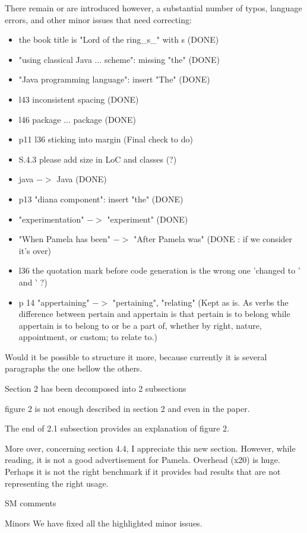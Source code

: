 \documentclass[10pt]{article}
\begin{document}
\begin{response}{There remain or are introduced however, a substantial number of typos, language errors, and other minor issues that need correcting:}
\begin{itemize}
\item the book title is "Lord of the ring\_s\_" with s (DONE)
\item "using classical Java ... scheme": missing "the" (DONE)
\item "Java programming language": insert "The" (DONE)
\item l43 inconsistent spacing (DONE)
\item l46 package ... package (DONE)
\item p11 l36 sticking into margin (Final check to do)
\item S.4.3 please add size in LoC and classes (?)
\item java $->$ Java (DONE)
\item p13 "diana component": insert "the" (DONE)
\item "experimentation" $->$ "experiment" (DONE)
\item "When Pamela has been" $->$ "After Pamela was" (DONE : if we consider it's over)
\item l36 the quotation mark before code generation is the wrong one 'changed to ' and ' ?)
\item p 14 "appertaining" $->$ "pertaining", "relating" (Kept as is. As verbs the difference between pertain and appertain is that pertain is to belong while appertain is to belong to or be a part of, whether by right, nature, appointment, or custom; to relate to.)
\end{itemize}

\end{response}

\pagebreak

\begin{response}{Would it be possible to structure it more, because currently it is several paragraphs the one bellow the others.}

Section 2 has been decomposed into 2 subsections

\end{response}


\begin{response}{figure 2 is not enough described in section 2 and even in the paper.}

The end of 2.1 subsection provides an explanation of figure 2.

\end{response}

\begin{response}{More over, concerning section 4.4, I appreciate this new section. However, while reading, it is not a good advertisement for Pamela. Overhead (x20) is huge. Perhaps it is not the right benchmark if it provides bad results that are not representing the right usage.}

SM comments

\end{response}

\begin{response}{Minors}
We have fixed all the highlighted minor issues.
\end{response}
\end{document}
